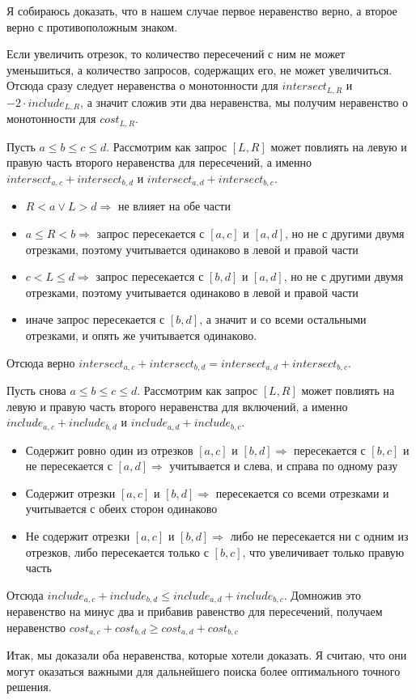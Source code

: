 Я собираюсь доказать, что в нашем случае первое неравенство верно, а второе верно с противоположным знаком.

Если увеличить отрезок, то количество пересечений с ним не может уменьшиться, а количество запросов, содержащих его, не может увеличиться. Отсюда сразу следует неравенства о монотонности для $intersect_{L, R}$ и $-2 \cdot include_{L, R}$, а значит сложив эти два неравенства, мы получим неравенство о монотонности для $cost_{L, R}$.

Пусть $a \leqslant b \leqslant c \leqslant d$. Рассмотрим как запрос $[L, R]$ может повлиять на левую и правую часть второго неравенства для пересечений, а именно $intersect_{a, c} + intersect_{b, d}$ и $intersect_{a, d} + intersect_{b, c}$.

\begin{itemize}
    \item $R < a \lor L > d \Rightarrow$ не влияет на обе части
    \item $a \leqslant R < b \Rightarrow$ запрос пересекается с $[a, c]$ и $[a, d]$, но не с другими двумя отрезками, поэтому учитывается одинаково в левой и правой части
    \item $c < L \leqslant d \Rightarrow$ запрос пересекается с $[b, d]$ и $[a, d]$, но не с другими двумя отрезками, поэтому учитывается одинаково в левой и правой части
    \item иначе запрос пересекается с $[b, d]$, а значит и со всеми остальными отрезками, и опять же учитывается одинаково.
\end{itemize}

Отсюда верно $intersect_{a, c} + intersect_{b, d} = intersect_{a, d} + intersect_{b, c}$.

Пусть снова $a \leqslant b \leqslant c \leqslant d$. Рассмотрим как запрос $[L, R]$ может повлиять на левую и правую часть второго неравенства для включений, а именно $include_{a, c} + include_{b, d}$ и $include_{a, d} + include_{b, c}$.

\begin{itemize}
    \item Содержит ровно один из отрезков $[a, c]$ и $[b, d] \Rightarrow$
    пересекается с $[b, c]$ и не пересекается с $[a, d] \Rightarrow$ учитывается и слева, и справа по одному разу
    \item Содержит отрезки $[a, c]$ и $[b, d] \Rightarrow$
    пересекается со всеми отрезками и учитывается с обеих сторон одинаково
    \item Не содержит отрезки $[a, c]$ и $[b, d] \Rightarrow$ либо не пересекается ни с одним из отрезков, либо пересекается только с $[b, c]$, что увеличивает только правую часть
\end{itemize}

Отсюда $include_{a, c} + include_{b, d} \leqslant include_{a, d} + include_{b, c}$. Домножив это неравенство на минус два и прибавив равенство для пересечений, получаем неравенство $cost_{a, c} + cost_{b, d} \geqslant cost_{a, d} + cost_{b, c}$

Итак, мы доказали оба неравенства, которые хотели доказать. Я считаю, что они могут оказаться важными для дальнейшего поиска более оптимального точного решения.